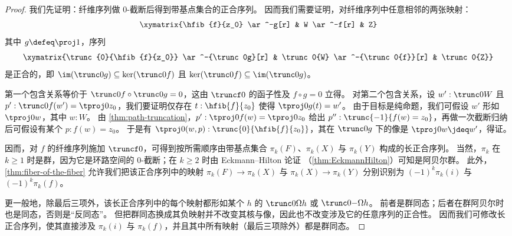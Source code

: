 \vspace*{0pt plus 10ex}
\goodbreak

\begin{proof}
  我们先证明：纤维序列做 0-截断后得到带基点集合的正合序列。
  因而我们需要证明，对纤维序列中任意相邻的两张映射：
  \[\xymatrix{\hfib{f}{z_0} \ar^-g[r] & W \ar^-f[r] & Z}\]
  其中 $g\defeq \proj1$，序列
  \[\xymatrix{\trunc{0}{\hfib{f}{z_0}} \ar^-{\trunc0g}[r] & \trunc0{W}
    \ar^-{\trunc0{f}}[r] & \trunc0{Z}}\]
  是正合的，即 $\im(\trunc0g)\subseteq\ker(\trunc0f)$ 且 $\ker(\trunc0f)\subseteq\im(\trunc0g)$。

  第一个包含关系等价于 $\trunc0f\circ\trunc0g=0$，这由 $\truncf0$ 的函子性及 $f\circ g=0$ 立得。
  对第二个包含关系，设 $w':\trunc0W$ 且 $p':\trunc0f(w')=\tproj0{z_0}$，我们要证明仅存在 ${t:\hfib{f}{z_0}}$ 使得 $\tproj0{g(t)}=w'$。
  由于目标是纯命题，我们可假设 $w'$ 形如 $\tproj0w$，其中 $w:W$。
  由 \cref{thm:path-truncation}，$p' : \tproj0{f(w)}=\tproj0{z_0}$ 给出 $p'': \trunc{-1}{f(w)=z_0}$，再做一次截断归纳后可假设有某个 $p:f(w)=z_0$。
  于是有 $\tproj0{(w,p)}:\trunc{0}{\hfib{f}{z_0}}$，其在 $\trunc0g$ 下的像是 $\tproj0w\jdeq w'$，得证。

  因而，对 $f$ 的纤维序列施加 $\truncf0$，可得到按所需顺序由带基点集合 $\pi_k(F)$、$\pi_k(X)$ 与 $\pi_k(Y)$ 构成的长正合序列。
  当然，$\pi_k$ 在 $k\ge1$ 时是群，因为它是环路空间的 0-截断；在 $k\ge 2$ 时由 Eckmann--Hilton 论证
  （\cref{thm:EckmannHilton}）可知是阿贝尔群。
  此外，\cref{thm:fiber-of-the-fiber} 允许我们把该正合序列中的映射 $\pi_k(F) \to \pi_k(X)$ 与 $\pi_k(X) \to \pi_k(Y)$ 分别识别为 $(-1)^k \pi_k(i)$ 与 $(-1)^k \pi_k(f)$。

  更一般地，除最后三项外，该长正合序列中的每个映射都形如某个 $h$ 的 $\trunc0{\Omega h}$ 或 $\trunc0{-\Omega h}$。
  前者是群同态；后者在群阿贝尔时也是同态，否则是“反同态”。
  但把群同态换成其负映射并不改变其核与像，因此也不改变涉及它的任意序列的正合性。
  因而我们可修改长正合序列，使其直接涉及 $\pi_k(i)$ 与 $\pi_k(f)$，并且其中所有映射（最后三项除外）都是群同态。
\end{proof}

